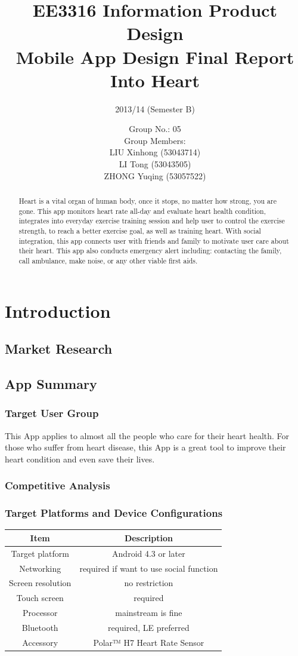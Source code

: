 \documentclass[10pt,a4paper,final]{scrartcl}
\author{
Group No.: 05 \\ 
Group Members: \\
LIU Xinhong (53043714) \\
LI Tong (53043505) \\
ZHONG Yuqing (53057522)
}
\title{
EE3316 Information Product Design \\ Mobile App Design Final Report \\ Into Heart}
\subtitle{2013/14 (Semester B)}
\begin{document}
\maketitle

\pagebreak

\begin{abstract}
Heart is a vital organ of human body, once it stops, no matter how strong, you are gone.  
This app monitors heart rate all-day and evaluate heart health condition, integrates into everyday exercise training session and help user to control the exercise strength, to reach a better exercise goal, as well as training heart. With social integration, this app connects user with friends and family to motivate user care about their heart. This app also conducts emergency alert including: contacting the family, call ambulance, make noise, or any other viable first aids. 
\end{abstract}



\tableofcontents

\section{Introduction}

\subsection{Market Research}


\subsection{App Summary}
\subsubsection{Target User Group}
This App applies to almost all the people who care for their heart health. For those who suffer from heart disease, this App is a great tool to improve their heart condition and even save their lives. 
\subsubsection{Competitive Analysis}

\subsubsection{Target Platforms and Device Configurations}
\begin{tabular}{|c|c|}
\hline 
Item & Description \\ 
\hline 
Target platform & Android 4.3 or later \\
Networking & required if want to use social function \\
Screen resolution & no restriction \\
Touch screen & required \\
Processor & mainstream is fine \\
Bluetooth & required, LE preferred \\
Accessory & Polar™ H7 Heart Rate Sensor \\
\hline 
\end{tabular} 
\end{document}
